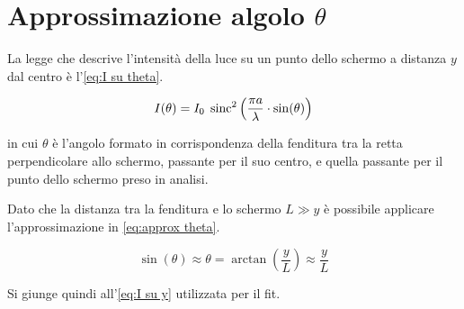\documentclass[../main.tex]{subfiles}
\begin{document}
\section{Approssimazione algolo $\theta$} \label{sec:approssimazione theta}

La legge che descrive l'intensità della luce su un punto dello schermo a distanza $y$ dal centro è l'\autoref{eq:I su theta}.

\begin{equation} \label{eq:I su theta}
    I(\theta) = I_{0} \; \operatorname{sinc}^{2} \left( \frac{\pi a}{\lambda} \cdot \sin(\theta)  \right)
\end{equation}

in cui $\theta$ è l'angolo formato in corrispondenza della fenditura tra la retta perpendicolare allo schermo, passante per il suo centro, e quella passante per il punto dello schermo preso in analisi.

Dato che la distanza tra la fenditura e lo schermo $L \gg y$ è possibile applicare l'approssimazione in \autoref{eq:approx theta}.

\begin{equation} \label{eq:approx theta}
    \sin(\theta) \approx \theta = \arctan\left( \frac{y}{L} \right) \approx \frac{y}{L} 
\end{equation}

Si giunge quindi all'\autoref{eq:I su y} utilizzata per il fit.
\end{document}

